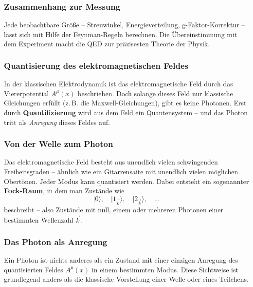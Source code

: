 \subsubsection*{Zusammenhang zur Messung}
Jede beobachtbare Größe – Streuwinkel, Energieverteilung, g-Faktor-Korrektur – lässt sich mit Hilfe der Feynman-Regeln berechnen. Die Übereinstimmung mit dem Experiment macht die QED zur präzisesten Theorie der Physik.

\subsubsection{Quantisierung des elektromagnetischen Feldes}

In der klassischen Elektrodynamik ist das elektromagnetische Feld durch das Viererpotential $A^\mu(x)$ beschrieben. Doch solange dieses Feld nur klassische Gleichungen erfüllt (z.\,B. die Maxwell-Gleichungen), gibt es keine Photonen. Erst durch \textbf{Quantifizierung} wird aus dem Feld ein Quantensystem – und das Photon tritt als \emph{Anregung} dieses Feldes auf.

\subsubsection*{Von der Welle zum Photon}
Das elektromagnetische Feld besteht aus unendlich vielen schwingenden Freiheitsgraden – ähnlich wie ein Gitarrensaite mit unendlich vielen möglichen Obertönen. Jeder Modus kann quantisiert werden. Dabei entsteht ein sogenannter \textbf{Fock-Raum}, in dem man Zustände wie
\[
\lvert 0 \rangle, \quad \lvert 1_{\vec{k}} \rangle, \quad \lvert 2_{\vec{k}} \rangle, \quad \dots
\]
beschreibt – also Zustände mit null, einem oder mehreren Photonen einer bestimmten Wellenzahl $\vec{k}$.

\subsubsection*{Das Photon als Anregung}
Ein Photon ist nichts anderes als ein Zustand mit einer einzigen Anregung des quantisierten Feldes $A^\mu(x)$ in einem bestimmten Modus. Diese Sichtweise ist grundlegend anders als die klassische Vorstellung einer Welle oder eines Teilchens.

